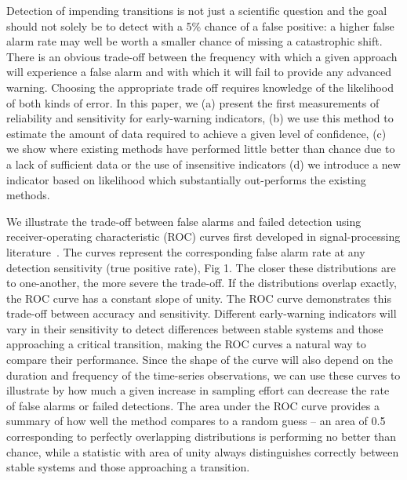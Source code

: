 \documentclass[authoryear,preprint,11pt]{elsarticle}
\begin{document}
Detection of impending transitions is not just a scientific question 
and the goal should not solely be to detect with a 5\% chance of a false positive:
a higher false alarm rate may well be  worth a smaller chance of  missing a catastrophic shift. 
There is an obvious trade-off between the frequency with which a given approach will experience a false alarm and
with which it will fail to provide any advanced warning. 
Choosing the appropriate trade off requires knowledge of the likelihood of both kinds of error.
In this paper, we
(a) present the first measurements of reliability and sensitivity for early-warning indicators, 
(b) we use this method to estimate the amount of data required to achieve a given level of confidence,  
(c) we show where existing methods have performed little better than chance due to a lack of sufficient data or the use of insensitive indicators 
(d) we introduce a new indicator based on likelihood which substantially out-performs the existing methods.     

We illustrate the trade-off between false alarms and failed detection using 
receiver-operating characteristic (ROC) curves first developed in signal-processing literature~\citep{Green1989, Keller2009}⁠. 
The curves represent the corresponding false alarm rate at any detection sensitivity (true positive rate), Fig 1.
The closer these distributions are to one-another, the more severe the trade-off.  
If the distributions overlap exactly, the ROC curve has a constant slope of unity.  
The ROC curve demonstrates this trade-off between accuracy and sensitivity.  
Different early-warning indicators will vary in their sensitivity to detect differences between stable systems and those approaching a critical transition, making the ROC curves a natural way to compare their performance.  
Since the shape of the curve will also depend on the duration and frequency of the time-series observations,
we can use these curves to illustrate by how much a given increase in sampling effort can decrease the rate of false alarms or failed detections.  
The area under the ROC curve provides a summary of how well the method compares to a random guess --
an area of 0.5 corresponding to perfectly overlapping distributions is performing no better than chance, while a statistic with area of unity always distinguishes correctly between stable systems and those approaching a transition. 
\end{document}
